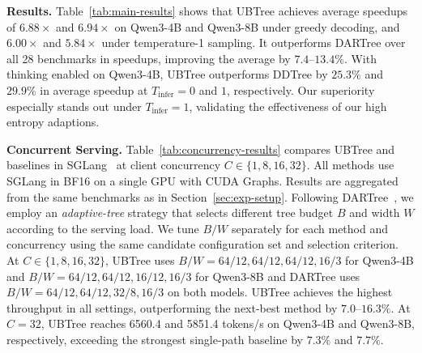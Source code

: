 \noindent\textbf{Results.}
\label{sec:exp-main-results}
Table~\ref{tab:main-results} shows that UBTree achieves average speedups of $6.88\times$ and $6.94\times$ on Qwen3-4B and Qwen3-8B under greedy decoding, and $6.00\times$ and $5.84\times$ under temperature-1 sampling. It outperforms DARTree over all 28 benchmarks in speedups, improving the average by $7.4$--$13.4\%$. With thinking enabled on Qwen3-4B, UBTree outperforms DDTree by $25.3\%$ and $29.9\%$ in average speedup at $T_{\mathrm{infer}}=0$ and $1$, respectively. Our superiority especially stands out under $T_{\mathrm{infer}}=1$, validating the effectiveness of our high entropy adaptions.

\noindent\textbf{Concurrent Serving.}
\label{sec:exp-main-concurrency}
Table~\ref{tab:concurrency-results} compares UBTree and baselines in SGLang~\citep{zheng2024sglang} at client concurrency $C\in\{1,8,16,32\}$. All methods use SGLang in BF16 on a single GPU with CUDA Graphs. Results are aggregated from the same benchmarks as in Section~\ref{sec:exp-setup}. Following DARTree~\citep{li2026dartree}, we employ an \textit{adaptive-tree} strategy that selects different tree budget $B$ and width $W$ according to the serving load. We tune \(B/W\) separately for each method and concurrency using the same candidate configuration set and selection criterion. At $C\in\{1,8,16,32\}$, UBTree uses $B/W=64/12,64/12,64/12,16/3$ for Qwen3-4B and $B/W=64/12,64/12,16/12,16/3$ for Qwen3-8B and DARTree uses $B/W=64/12,64/12,32/8,16/3$ on both models. UBTree achieves the highest throughput in all settings, outperforming the next-best method by $7.0$--$16.3\%$. At $C=32$, UBTree reaches 6560.4 and 5851.4 tokens/s on Qwen3-4B and Qwen3-8B, respectively, exceeding the strongest single-path baseline by $7.3\%$ and $7.7\%$.
